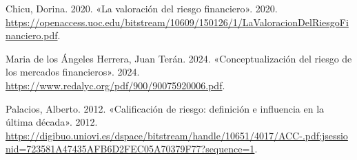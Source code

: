 \documentclass[
  letterpaper,
  DIV=11,
  numbers=noendperiod]{scrreprt}
\newlength{\cslhangindent}
\newenvironment{CSLReferences}[2] %
 {\begin{list}{}{%
  \setlength{\itemindent}{0pt}
  \setlength{\leftmargin}{0pt}
  \setlength{\parsep}{0pt}
  \ifodd #1
   \setlength{\leftmargin}{\cslhangindent}
   \setlength{\itemindent}{-1\cslhangindent}
  \fi
  \setlength{\itemsep}{#2\baselineskip}}}
 {\end{list}}
\begin{document}
\label{refs}
\begin{CSLReferences}{1}{0}
Chicu, Dorina. 2020. {«La valoración del riesgo financiero»}. 2020.
\url{https://openaccess.uoc.edu/bitstream/10609/150126/1/LaValoracionDelRiesgoFinanciero.pdf}.

Maria de los Ángeles Herrera, Juan Terán. 2024. {«Conceptualización del
riesgo de los mercados financieros»}. 2024.
\url{https://www.redalyc.org/pdf/900/90075920006.pdf}.

Palacios, Alberto. 2012. {«Calificación de riesgo: definición e
influencia en la última década»}. 2012.
\url{https://digibuo.uniovi.es/dspace/bitstream/handle/10651/4017/ACC-.pdf;jsessionid=723581A47435AFB6D2FEC05A70379F77?sequence=1}.

\end{CSLReferences}
\end{document}
